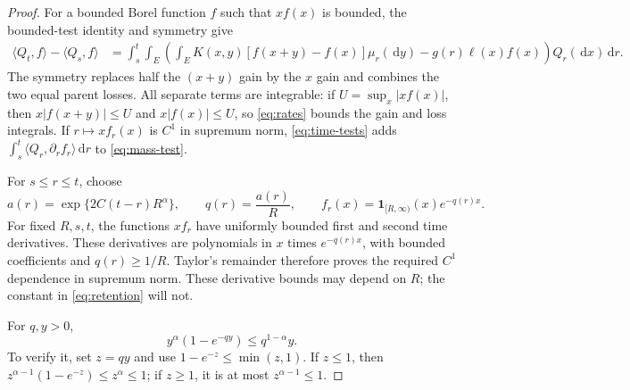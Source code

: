 \documentclass[11pt]{article}
\newcommand{\pair}[2]{\langle #1,#2\rangle}
\newcommand{\ind}{\mathbf{1}}
\newcommand{\dd}{\,\mathrm{d}}
\begin{document}
\begin{proof}
For a bounded Borel function $f$ such that $xf(x)$ is bounded, the bounded-test identity and symmetry give
\begin{align}
 \pair{Q_t}{f}-\pair{Q_s}{f}
 &=\int_s^t\int_E\left(\int_E K(x,y)[f(x+y)-f(x)]\mu_r(\dd y)
       -g(r)\ell(x)f(x)\right)Q_r(\dd x)\dd r.
 \label{eq:mass-test}
\end{align}
The symmetry replaces half the $(x+y)$ gain by the $x$ gain and combines the two equal parent losses. All separate terms are integrable: if $U=\sup_x|xf(x)|$, then $x|f(x+y)|\le U$ and $x|f(x)|\le U$, so \eqref{eq:rates} bounds the gain and loss integrals. If $r\mapsto xf_r(x)$ is $C^1$ in supremum norm, \eqref{eq:time-tests} adds $\int_s^t\pair{Q_r}{\partial_r f_r}\dd r$ to \eqref{eq:mass-test}.

For $s\le r\le t$, choose
\[
 a(r)=\exp\{2C(t-r)R^\alpha\},\qquad q(r)=\frac{a(r)}R,
 \qquad f_r(x)=\ind_{[R,\infty)}(x)e^{-q(r)x}.
\]
For fixed $R,s,t$, the functions $xf_r$ have uniformly bounded first and second time derivatives. These derivatives are polynomials in $x$ times $e^{-q(r)x}$, with bounded coefficients and $q(r)\ge1/R$. Taylor's remainder therefore proves the required $C^1$ dependence in supremum norm. These derivative bounds may depend on $R$; the constant in \eqref{eq:retention} will not.

For $q,y>0$,
\begin{equation}\label{eq:exp-bound}
 y^\alpha(1-e^{-qy})\le q^{1-\alpha}y.
\end{equation}
To verify it, set $z=qy$ and use $1-e^{-z}\le\min(z,1)$. If $z\le1$, then $z^{\alpha-1}(1-e^{-z})\le z^\alpha\le1$; if $z\ge1$, it is at most $z^{\alpha-1}\le1$.


\end{proof}
\end{document}
